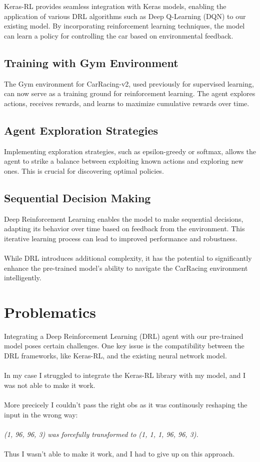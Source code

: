 \documentclass{article}
\begin{document}
Keras-RL provides seamless integration with Keras models, enabling the application of various DRL algorithms such as Deep Q-Learning (DQN) to our existing model. By incorporating reinforcement learning techniques, the model can learn a policy for controlling the car based on environmental feedback.

\subsection{Training with Gym Environment}

The Gym environment for CarRacing-v2, used previously for supervised learning, can now serve as a training ground for reinforcement learning. The agent explores actions, receives rewards, and learns to maximize cumulative rewards over time.

\subsection{Agent Exploration Strategies}

Implementing exploration strategies, such as epsilon-greedy or softmax, allows the agent to strike a balance between exploiting known actions and exploring new ones. This is crucial for discovering optimal policies.

\subsection{Sequential Decision Making}

Deep Reinforcement Learning enables the model to make sequential decisions, adapting its behavior over time based on feedback from the environment. This iterative learning process can lead to improved performance and robustness.
\\
\\
While DRL introduces additional complexity, it has the potential to significantly enhance the pre-trained model's ability to navigate the CarRacing environment intelligently.

\section{Problematics}

Integrating a Deep Reinforcement Learning (DRL) agent with our pre-trained model poses certain challenges. One key issue is the compatibility between the DRL frameworks, like Keras-RL, and the existing neural network model.
\\
\\
In my case I struggled to integrate the Keras-RL library with my model, and I was not able to make it work.
\\
\\
More precicely I couldn't pass the right obs as it was continously reshaping the input in the wrong way:
\\
\\
\emph{(1, 96, 96, 3) was forcefully transformed to (1, 1, 1, 96, 96, 3).}
\\
\\
Thus I wasn't able to make it work, and I had to give up on this approach.
\end{document}
